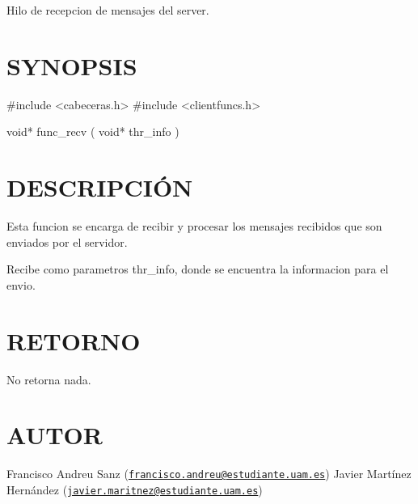 Hilo de recepcion de mensajes del server.\hypertarget{ServerReply_SYNOPSIS}{}\section{S\-Y\-N\-O\-P\-S\-I\-S}\label{ServerReply_SYNOPSIS}
\begin{DoxyVerb} #include  <cabeceras.h>
   #include  <clientfuncs.h>

 void* func_recv ( void* thr_info )
\end{DoxyVerb}
\hypertarget{ServerReply_descripcion}{}\section{D\-E\-S\-C\-R\-I\-P\-C\-IÓ\-N}\label{ServerReply_descripcion}
Esta funcion se encarga de recibir y procesar los mensajes recibidos que son enviados por el servidor.

Recibe como parametros thr\-\_\-info, donde se encuentra la informacion para el envio.\hypertarget{ServerReply_retorno}{}\section{R\-E\-T\-O\-R\-N\-O}\label{ServerReply_retorno}
No retorna nada.\hypertarget{ServerReply_authors}{}\section{A\-U\-T\-O\-R}\label{ServerReply_authors}
Francisco Andreu Sanz (\href{mailto:francisco.andreu@estudiante.uam.es}{\tt francisco.\-andreu@estudiante.\-uam.\-es}) Javier Martínez Hernández (\href{mailto:javier.maritnez@estudiante.uam.es}{\tt javier.\-maritnez@estudiante.\-uam.\-es}) 

 